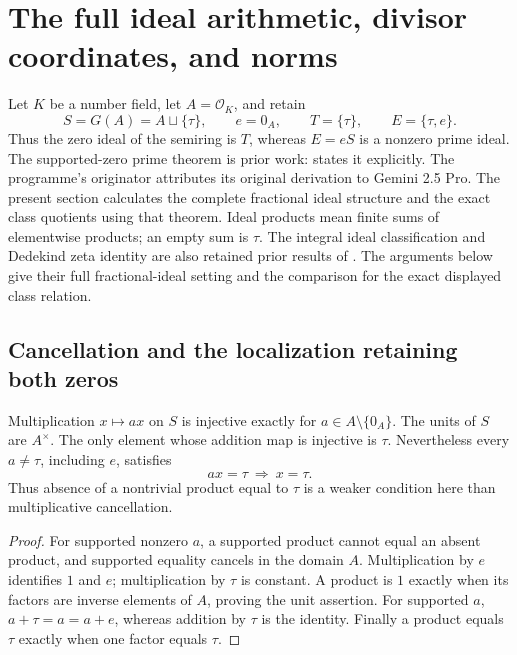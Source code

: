 \section{The full ideal arithmetic, divisor coordinates, and norms}
\label{sec:sz-divisors}

Let \(K\) be a number field, let \(A=\mathcal O_K\), and retain
\[
 S=G(A)=A\sqcup\{\tau\},\qquad e=0_A,\qquad
 T=\{\tau\},\qquad E=\{\tau,e\}.
\]
Thus the zero ideal of the semiring is \(T\), whereas \(E=eS\) is a
nonzero prime ideal. The supported-zero prime theorem is prior work:
\cite[\texttt{thm:zero-prime-not-irr}]{globalization} states it explicitly.
The programme's originator attributes its original derivation to
Gemini 2.5 Pro. The present section calculates the complete fractional
ideal structure and the exact class quotients using that theorem.
Ideal products mean finite sums of elementwise products; an empty
sum is \(\tau\).
The integral ideal classification and Dedekind zeta identity are also
retained prior results of
\cite[\texttt{thm:OK-ideals-spectrum}, \texttt{thm:Dedekind-zeta}]{globalization}.
The arguments below give their full fractional-ideal setting and
the comparison for the exact displayed class relation.

\subsection{Cancellation and the localization retaining both zeros}

\begin{proposition}\label{prop:sz-regular}
Multiplication \(x\mapsto ax\) on \(S\) is injective exactly for
\(a\in A\setminus\{0_A\}\). The units of \(S\) are \(A^\times\).
The only element whose addition map is injective is \(\tau\).
Nevertheless every \(a\ne\tau\), including \(e\), satisfies
\[
 ax=\tau\ \Longrightarrow\ x=\tau .
\]
Thus absence of a nontrivial product equal to \(\tau\) is a weaker
condition here than multiplicative cancellation.
\end{proposition}
\begin{proof}
For supported nonzero \(a\), a supported product cannot equal an
absent product, and supported equality cancels in the domain \(A\).
Multiplication by \(e\) identifies \(1\) and \(e\); multiplication
by \(\tau\) is constant. A product is \(1\) exactly when its factors
are inverse elements of \(A\), proving the unit assertion.
For supported \(a\), \(a+\tau=a=a+e\), whereas addition by \(\tau\)
is the identity. Finally a product equals \(\tau\) exactly when one
factor equals \(\tau\).
\end{proof}

